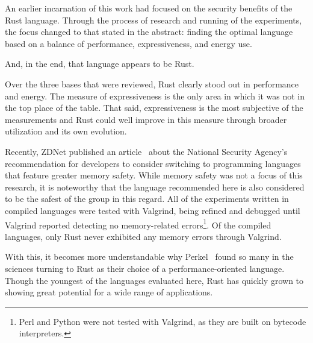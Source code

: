 An earlier incarnation of this work had focused on the security benefits of the Rust language. Through the process of research and running of the experiments, the focus changed to that stated in the abstract: finding the optimal language based on a balance of performance, expressiveness, and energy use.

And, in the end, that language appears to be Rust.

Over the three bases that were reviewed, Rust clearly stood out in performance and energy. The measure of expressiveness is the only area in which it was not in the top place of the table. That said, expressiveness is the most subjective of the measurements and Rust could well improve in this measure through broader utilization and its own evolution.

Recently, ZDNet published an article~\cite{tung} about the National Security Agency's recommendation for developers to consider switching to programming languages that feature greater memory safety. While memory safety was not a focus of this research, it is noteworthy that the language recommended here is also considered to be the safest of the group in this regard. All of the experiments written in compiled languages were tested with Valgrind, being refined and debugged until Valgrind reported detecting no memory-related errors\footnote{Perl and Python were not tested with Valgrind, as they are built on bytecode interpreters.}. Of the compiled languages, only Rust never exhibited any memory errors through Valgrind.

With this, it becomes more understandable why Perkel~\cite{nature} found so many in the sciences turning to Rust as their choice of a performance-oriented language. Though the youngest of the languages evaluated here, Rust has quickly grown to showing great potential for a wide range of applications.
